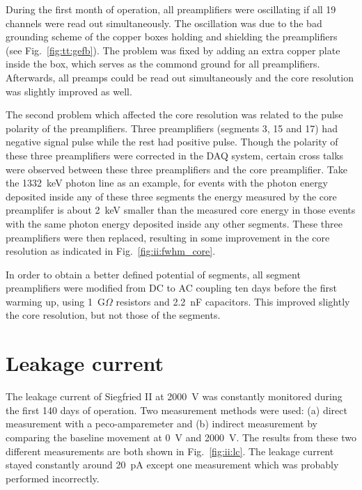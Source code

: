During the first month of operation, all preamplifiers were oscillating if all 19 channels were read out simultaneously. The oscillation was due to the bad grounding scheme of the copper boxes holding and shielding the preamplifiers (see Fig.~\ref{fig:tt:gefb}). The problem was fixed by adding an extra copper plate inside the box, which serves as the commond ground for all preamplifiers. Afterwards, all preamps could be read out simultaneously
and the core resolution was slightly improved as well.

The second problem which affected the core resolution was related to the pulse polarity of the preamplifiers. Three preamplifiers (segments 3, 15 and 17) had negative signal pulse while the rest had positive pulse. Though the polarity of these three preamplifiers were corrected in the DAQ system, certain cross talks were observed between these three preamplifiers and the core preamplifier. Take the 1332~keV photon line as an example, for events with the photon energy deposited inside any of these three segments the energy measured by the core preamplifer is about 2~keV smaller than the measured core energy in those events with the same photon energy deposited inside any other segments. These three preamplifiers were then replaced, resulting in some improvement in the core resolution as indicated in Fig.~\ref{fig:ii:fwhm_core}.

In order to obtain a better defined potential of segments, all segment preamplifiers were modified from DC to AC coupling ten days before the first warming up, using 1~G$\Omega$ resistors and 2.2~nF capacitors. This improved slightly the core resolution, but not those of the segments.


\section{Leakage current}
\label{sec:ii:current}
The leakage current of Siegfried II at 2000~V was constantly monitored during the first 140 days of operation. Two measurement methods were used: (a) direct measurement with a peco-amparemeter and (b) indirect measurement by comparing the baseline movement at 0~V and 2000~V. The results from these two different measurements are both shown in Fig.~\ref{fig:ii:lc}. The leakage current stayed constantly around 20~pA except one measurement which was probably performed incorrectly.

